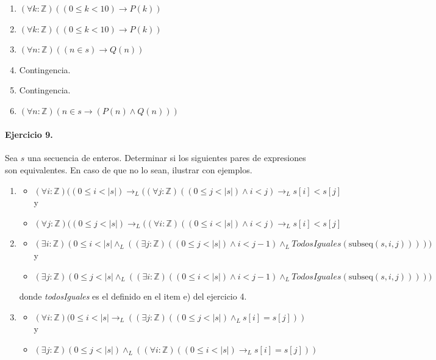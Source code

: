\documentclass[a4paper]{article}
\begin{document}
\begin{enumerate}[label=\alph*)]
	\item $(\forall k: \mathbb{Z})((0\leq k <10)\rightarrow P(k))$
	\item $(\forall k: \mathbb{Z})((0\leq k <10)\rightarrow P(k))$
	\item $(\forall n: \mathbb{Z})((n \in s)\rightarrow Q(n))$
	\item Contingencia.
	\item Contingencia.
	\item $(\forall n:\mathbb{Z})(n\in s\rightarrow (P(n)\wedge Q(n)))$
\end{enumerate}
\paragraph{Ejercicio 9.} Sea $s$ una secuencia de enteros. Determinar si los siguientes pares de expresiones son equivalentes. En caso de que no lo sean, ilustrar con ejemplos.
\begin{enumerate}[label=\alph*)]
\item 
\begin{itemize}
\item $(\forall i: \mathbb{Z})((0\leq i< |s|)\rightarrow_L ((\forall j: \mathbb{Z})((0\leq j< |s|)\wedge i <j)\rightarrow_L s[i]<s[j]$ y
\item $(\forall j: \mathbb{Z})((0\leq j< |s|)\rightarrow_L ((\forall i: \mathbb{Z})((0\leq i< |s|)\wedge i <j)\rightarrow_L s[i]<s[j]$
\end{itemize}
\item 
\begin{itemize}
\item $(\exists i: \mathbb{Z})(0\leq i< |s|\wedge_L ((\exists j: \mathbb{Z})((0\leq j< |s|)\wedge i < j-1)\wedge_L TodosIguales(\textrm{subseq}(s,i,j)))))$ y
\item $(\exists j: \mathbb{Z})(0\leq j< |s|\wedge_L ((\exists i: \mathbb{Z})((0\leq i< |s|)\wedge i < j-1)\wedge_L TodosIguales(\textrm{subseq}(s,i,j)))))$
\end{itemize}
donde \textit{todosIguales} es el definido en el item e) del ejercicio 4.
\item 
\begin{itemize}
\item $(\forall i: \mathbb{Z})(0\leq i< |s|\rightarrow_L ((\exists j: \mathbb{Z})((0\leq j< |s|)\wedge_L s[i] =s[j]))$ y
\item $(\exists j: \mathbb{Z})(0\leq j< |s|)\wedge_L ((\forall i: \mathbb{Z})((0\leq i< |s|)\rightarrow_L s[i] =s[j]))$ 
\end{itemize}
\end{enumerate} 
\end{document}
